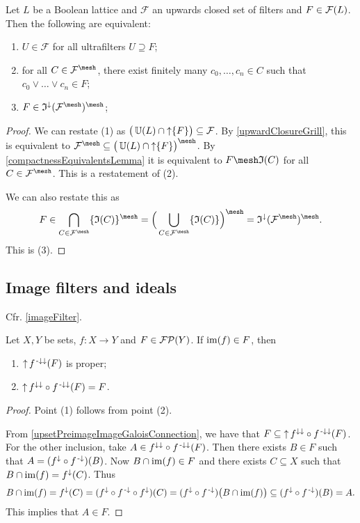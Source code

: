 \begin{proposition} \label{ChoquetModificationFilterSet}
Let $L$ be a Boolean lattice and $\mathcal{F}$ an upwards closed set of filters and $F\in \operatorname{\mathcal{F}}(L)$. Then the following are equivalent:
\begin{enumerate}
\item $U\in \mathcal{F}$ for all ultrafilters $U\supseteq F$;
\item for all $C\in \mathcal{F}^\mesh$, there exist finitely many $c_0,\ldots, c_n \in C$ such that $c_0 \vee \ldots \vee c_n \in F$;
\item $F\in \mathfrak{I}^\imf(\mathcal{F}^\mesh)^\mesh$;
\end{enumerate}
\end{proposition}
\begin{proof}
We can restate (1) as $\big(\operatorname{\mathbb{U}}(L) \cap \operatorname{\uparrow}\{F\}\big) \subseteq \mathcal{F}$. By \ref{upwardClosureGrill}, this is equivalent to $\mathcal{F}^\mesh \subseteq \big(\ultrafilters(L) \cap \upset\{F\}\big)^\mesh$. By \ref{compactnessEquivalentsLemma} it is equivalent to $F\mesh \mathfrak{I}(C)$ for all $C\in \mathcal{F}^\mesh$. This is a restatement of (2).

We can also restate this as
\[ F \in \bigcap_{C\in \mathcal{F}^\mesh} \{\mathfrak{I}(C)\}^\mesh = \Big(\bigcup_{C\in \mathcal{F}^\mesh}\{\mathfrak{I}(C)\}\Big)^\mesh = \mathfrak{I}^\imf(\mathcal{F}^\mesh)^\mesh. \]
This is (3).
\end{proof}

\subsection{Image filters and ideals}
Cfr. \ref{imageFilter}.

\begin{lemma} \label{filterInImageIsImageFilter}
Let $X, Y$ be sets, $f: X\to Y$ and $F\in \operatorname{\mathcal{FP}}(Y)$. If $\operatorname{im}(f)\in F$, then 
\begin{enumerate}
\item $\operatorname{\uparrow} f^{{\text{\hspace{0.15em}-}\downarrow}\downarrow}(F)$ is proper;
\item $\operatorname{\uparrow} f^{\downarrow\downarrow}\circ f^{{\text{\hspace{0.15em}-}\downarrow}\downarrow}(F) = F$.
\end{enumerate}
\end{lemma}
\begin{proof}
Point (1) follows from point (2).

From \ref{upsetPreimageImageGaloisConnection}, we have that $F\subseteq \operatorname{\uparrow} f^{\downarrow\downarrow}\circ f^{{\text{\hspace{0.15em}-}\downarrow}\downarrow}(F)$. For the other inclusion, take $A\in f^{\downarrow\downarrow}\circ f^{{\text{\hspace{0.15em}-}\downarrow}\downarrow}(F)$. Then there exists $B\in F$ such that $A = (f^\downarrow\circ f^{\text{\hspace{0.15em}-}\downarrow})(B)$. Now $B\cap \operatorname{im}(f)\in F$ and there exists $C\subseteq X$ such that $B\cap \operatorname{im}(f) = f^\downarrow(C)$. Thus
\[ B\cap \operatorname{im}(f) = f^\downarrow(C) = (f^\downarrow\circ f^{\text{\hspace{0.15em}-}\downarrow}\circ f^\downarrow)(C) = (f^\downarrow\circ f^{\text{\hspace{0.15em}-}\downarrow})\big(B\cap \operatorname{im}(f)\big) \subseteq (f^\downarrow\circ f^{\text{\hspace{0.15em}-}\downarrow})(B) = A. \]
This implies that $A\in F$.
\end{proof}

